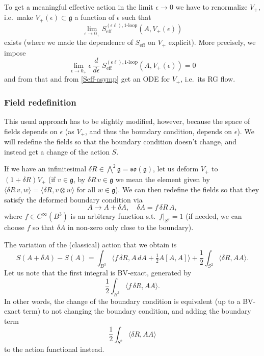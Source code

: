 \documentclass[a4paper]{amsart}
\theoremstyle{plain}
\theoremstyle{definition}
\newcommand{\mf}{\mathfrak}
\newcommand{\g}{\mathfrak{g}}
\newcommand{\bw}{{\textstyle\bigwedge}}
\newcommand{\la}{\langle}
\newcommand{\ra}{\rangle}
\begin{document}
To get a meaningful effective action in the limit $\epsilon\to0$ we have to renormalize $V_+$, i.e.\ make $V_+(\epsilon)\subset\g$  a function of $\epsilon$ such that
$$
\lim_{\epsilon\to0_+}S_\text{eff}^{(\epsilon\ell),\text{1-loop}}(A,V_+(\epsilon))
$$
exists (where we made the dependence of $S_\text{eff}$ on $V_+$ explicit). More precisely, we impose
\begin{equation}\label{RG-howto}
\lim_{\epsilon\to0_+} \epsilon\,\frac d{d\epsilon}\; S_\text{eff}^{(\epsilon\ell),\text{1-loop}}(A,V_+(\epsilon))=0
\end{equation}
and from that and from \eqref{Seff-asymp} get an ODE for $V_+$, i.e.\ its RG flow.

\subsubsection{Field redefinition}
This usual approach has to be slightly modified, however, because the space of fields depends on $\epsilon$ (as $V_+$, and thus the boundary condition, depends on $\epsilon$). We will redefine the fields so that the boundary condition doesn't change, and instead get a change of the action $S$.

If we have an infinitesimal $\delta R\in\bw^2\g=\mf{so}(\g)$, let us deform $V_+$ to $(1+\delta R)V_+$ (if $v\in\g$, by $\delta R\,v\in\g$ we mean the element given by $\la\delta R\,v,w\ra=\la \delta R,v\otimes w\ra$ for all $w\in\g$). We can then redefine the fields so that they satisfy the deformed boundary condition via 
$$A\to A+\delta A, \quad\delta A= f\,\delta R\,A,$$
where $f\in C^\infty(B^3)$ is an arbitrary function s.t.\ $f|_{S^2}=1$ (if needed, we can choose $f$ so that $\delta A$ in non-zero only close to the boundary).%


The variation of the (classical) action that we obtain is
$$S(A+\delta A)-S(A) = 
\int_{B^3}\bigl\la f\,\delta R, A\,dA+\tfrac12A[A,A]\bigr\ra + \frac12\int_{S^2}\la \delta R,AA\ra.
$$
 Let us note that the first integral is BV-exact, generated by
 $$\frac12\int_{B^3}\la f\,\delta R, AA\ra.$$
In other words, the change of the boundary condition is equivalent (up to a BV-exact term) to not changing the boundary condition, and adding the boundary term
$$\frac12\int_{S^2}\la \delta R,AA\ra$$
to the action functional instead.
\end{document}
